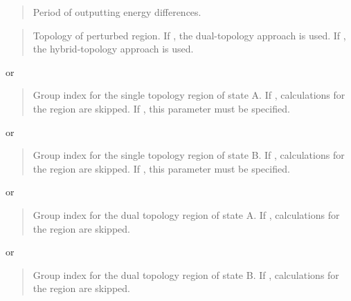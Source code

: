 \documentclass[a4paper,11pt,oneside,english]{sphinxmanual}
\begin{document}
 
\begin{quote}


Period of outputting energy differences.
\end{quote}

 
\begin{quote}


Topology of perturbed region.
If , the dual-topology approach is used.
If , the hybrid-topology approach is used.
\end{quote}

  or 
\begin{quote}


Group index for the single topology region of state A.
If , calculations for the region are skipped.
If , this parameter must be specified.
\end{quote}

  or 
\begin{quote}


Group index for the single topology region of state B.
If , calculations for the region are skipped.
If , this parameter must be specified.
\end{quote}

  or 
\begin{quote}


Group index for the dual topology region of state A.
If , calculations for the region are skipped.
\end{quote}

  or 
\begin{quote}


Group index for the dual topology region of state B.
If , calculations for the region are skipped.
\end{quote}
\end{document}
